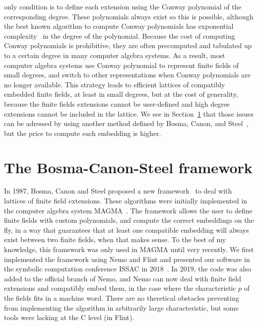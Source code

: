 only condition is to define each extension using the Conway polynomial of the
corresponding degree. These polynomials always exist so this is possible,
although the best known algorithm to compute Conway polynomials has exponential
complexity~\cite{HL98} in the degree of the polynomial. Because the cost of
computing Conway polynomials is
prohibitive, they are often precomputed and tabulated up to a certain degree in
many computer algebra systems. As a result, most computer algebra systems use
Conway polynomial to represent finite fields of small degrees, and switch to
other representations when Conway polynomials are no longer available. This
strategy leads to efficient lattices of compatibly embedded finite fields, at
least in small degrees, but at the cost of generality, because the finite fields
extensions cannot be user-defined and high degree extensions cannot be included
in the lattice. We see in Section~\ref{sec:bosma-canon-steel} that those issues
can be adressed by using another method 
defined by Bosma, Canon, and Steel~\cite{BCS97}, but the price to compute each
embedding is higher.
%

\section{The Bosma-Canon-Steel framework}
\label{sec:bosma-canon-steel}

In 1987, Bosma, Canon and Steel proposed a new framework~\cite{BCS97} to deal
with lattices of finite field extensions. These algorithms were initially
implemented in the computer algebra system MAGMA~\cite{Magma}. The framework allows the user
to define finite fields with custom polynomials, and compute the
correct embeddings on the fly, in a way that guarantees that at least one
compatible embedding will always exist between two finite fields, when that
makes sense. To the best of my knowledge, this framework was only used in MAGMA
until very recently. We first implemented the framework using Nemo and Flint and
presented our software in the symbolic computation conference ISSAC in
2018~\cite{DRR18}. In 2019, the code was also added to the official branch of
Nemo, and Nemo can now deal with finite field extensions and compatibly embed
them, in the case where the characteristic $p$ of the fields fits in a machine
word. There are no theretical obstacles preventing from implementing the
algorithm in arbitrarily large characteristic, but some tools were lacking at
the C level (\ie in Flint).

